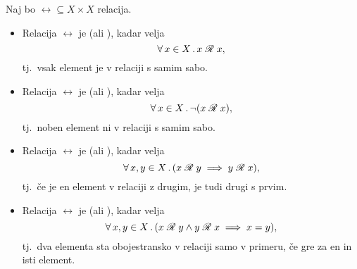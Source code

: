                \begin{definicija}
                        Naj bo $\rel \subseteq X \times X$ relacija.
                        \begin{itemize}
                                \item
                                        Relacija $\rel$ je  (ali ), kadar velja
                                        \[\xall{x}[X]{\rel[x][x]},\]
                                        tj.~vsak element je v relaciji s samim sabo.
                                \item
                                        Relacija $\rel$ je  (ali ), kadar velja
                                        \[\xall{x}[X]{\lnot(\rel[x][x])},\]
                                        tj.~noben element ni v relaciji s samim sabo.
                                \item
                                        Relacija $\rel$ je  (ali ), kadar velja
                                        \[\all{x, y}[X]{\rel[x][y] \implies \rel[y][x]},\]
                                        tj.~če je en element v relaciji z drugim, je tudi drugi s prvim.
                                \item
                                        Relacija $\rel$ je  (ali ), kadar velja
                                        \[\all{x, y}[X]{\rel[x][y] \land \rel[y][x] \implies x = y},\]
                                        tj.~dva elementa sta obojestransko v relaciji samo v primeru, če gre za en in isti element.


\end{itemize}
\end{definicija}

